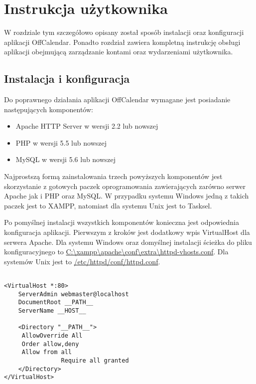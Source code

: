 \chapter{Instrukcja użytkownika}
\label{cha:instrUzytk}

W rozdziale tym szczegółowo opisany został sposób instalacji oraz konfiguracji aplikacji OffCalendar. Ponadto rozdział zawiera kompletną instrukcję obsługi aplikacji obejmującą zarządzanie kontami oraz wydarzeniami użytkownika.

\section{Instalacja i konfiguracja}
\label{sec:instKonf}

Do poprawnego działania aplikacji OffCalendar wymagane jest posiadanie następujących komponentów:

\begin{itemize}
\item Apache HTTP Server w wersji 2.2 lub nowszej
\item PHP w wersji 5.5 lub nowszej
\item MySQL w wersji 5.6 lub nowszej
\end{itemize}

Najprostszą formą zainstalowania trzech powyższych komponentów jest skorzystanie z gotowych paczek oprogramowania zawierających zarówno serwer Apache jak i PHP oraz MySQL. W przypadku systemu Windows jedną z takich paczek jest to XAMPP, natomiast dla systemu Unix jest to Tasksel.

Po pomyślnej instalacji wszystkich komponentów konieczna jest odpowiednia konfiguracja aplikacji. Pierwszym z kroków jest dodatkowy wpis VirtualHost dla serwera Apache. Dla systemu Windows oraz domyślnej instalacji ścieżka do pliku konfiguracyjnego to \url{C:\xampp\apache\conf\extra\httpd-vhosts.conf}. Dla systemów Unix jest to \url{/etc/httpd/conf/httpd.conf}.

\begin{lstlisting}[caption=Konfiguracja serwera Apache., label=amb, captionpos=b]

<VirtualHost *:80>
    ServerAdmin webmaster@localhost
    DocumentRoot __PATH__
    ServerName __HOST__

    <Directory "__PATH__">
   	 AllowOverride All
   	 Order allow,deny
   	 Allow from all
            	Require all granted
    </Directory>
</VirtualHost>

\end{lstlisting}

